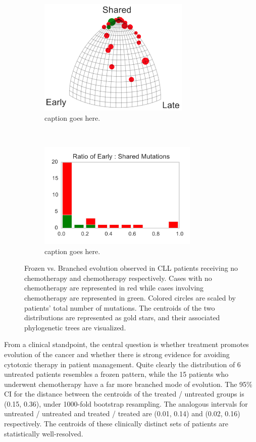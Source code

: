 \documentclass[a4paper,11pt]{article}
\begin{document}
\begin{figure}
    \begin{subfigure}{0.5\linewidth}
    \centering
    \includegraphics[height=2.2in]{figures/CLL_triplet.png}
    \caption{caption goes here.}
    \end{subfigure}
    ~
    \begin{subfigure}{0.5\linewidth}
    \centering
    \includegraphics[height=2in]{figures/CLL_histogram.pdf}
    \caption{caption goes here.}
    \end{subfigure}

    \caption{Frozen vs. Branched evolution observed in CLL patients receiving no chemotherapy and chemotherapy respectively. Cases with no chemotherapy are represented in red while cases involving chemotherapy are represented in green. Colored circles are scaled by patients' total number of mutations. The centroids of the two distributions are represented as gold stars, and their associated phylogenetic trees are visualized.}
    \label{fig:chemoCLL}
\end{figure}

From a clinical standpoint, the central question is whether treatment promotes evolution of the cancer and whether there is strong evidence for avoiding cytotoxic therapy in patient management.
Quite clearly the distribution of 6 untreated patients resembles a frozen pattern, while the 15 patients who underwent chemotherapy have a far more branched mode of evolution.
The 95\% CI for the distance between the centroids of the treated / untreated groups is (0.15, 0.36), under 1000-fold bootstrap resampling.
The analogous intervals for untreated / untreated and treated / treated are (0.01, 0.14) and (0.02, 0.16) respectively.
The centroids of these clinically distinct sets of patients are statistically well-resolved.
\end{document}
